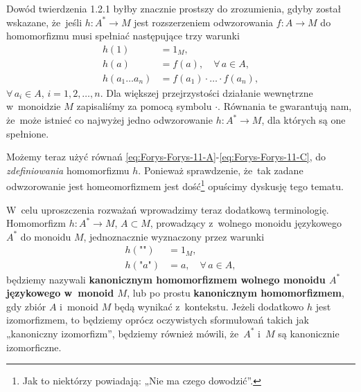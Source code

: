 \documentclass[a4paper,11pt]{article}
\begin{document}
\start {} Dowód twierdzenia 1.2.1 byłby znacznie prostszy do
zrozumienia, gdyby został wskazane, że~jeśli $h : A^{ * } \to M$ jest
rozszerzeniem odwzorowania $f : A \to M$ do homomorfizmu musi spełniać
następujące trzy warunki
\begin{subequations}
  \begin{align}
    \label{eq:Forys-Forys-11-A}
    h( 1 ) &= 1_{ M }, \\
    \label{eq:Forys-Forys-11-B}
    h( a ) &= f( a ), \quad \forall \, a \in A, \\
    \label{eq:Forys-Forys-11-C}
    h( a_{ 1 } \ldots a_{ n } )
           &= f( a_{ 1 } ) \cdot \ldots \cdot f( a_{ n } ),
  \end{align}
\end{subequations}
$\forall \, a_{ i } \in A$, $i = 1, 2, \ldots, n$. Dla większej przejrzystości działanie
wewnętrzne w~monoidzie $M$ zapisaliśmy za pomocą symbolu $\cdot$. Równania te
gwarantują nam, że~może istnieć co najwyżej jedno odwzorowanie
$h : A^{ * } \to M$, dla których są one spełnione.

Możemy teraz użyć równań
\eqref{eq:Forys-Forys-11-A}-\eqref{eq:Forys-Forys-11-C}, do
\textit{zdefiniowania} homomorfizmu $h$. Ponieważ sprawdzenie, że~tak zadane
odwzorowanie jest homeomorfizmem jest dość\footnote{Jak to niektórzy
  powiadają: „Nie ma czego dowodzić”.} opuścimy dyskusję tego tematu.

\vspace{\spaceFour}





\start {} W~celu uproszczenia rozważań wprowadzimy teraz dodatkową
terminologię. Homomorfizm $h : A^{ * } \to M$, $A \subset M$, prowadzący z~wolnego
monoidu językowego $A^{ * }$ do monoidu $M$, jednoznacznie wyznaczony przez
warunki
\begin{subequations}
  \begin{align}
    \label{eq:Forys-Forys-12-A}
    h( \texttt{""} ) &= 1_{ M }, \\
    \label{eq:Forys-Forys-12-B}
    h( \texttt{"} a \texttt{"} ) &= a, \quad
                                   \forall \, a \in A,
  \end{align}
\end{subequations}
będziemy nazywali \textbf{kanonicznym homomorfizmem wolnego monoidu $A^{ * }$
  językowego w~monoid $M$}, lub po prostu \textbf{kanonicznym
  homomorfizmem}, gdy zbiór $A$ i~monoid $M$ będą wynikać z~kontekstu.
Jeżeli dodatkowo $h$ jest izomorfizmem, to będziemy oprócz oczywistych
sformułowań takich jak „kanoniczny izomorfizm”, będziemy również mówili,
że~$A^{ * }$ i~$M$ są kanonicznie izomorficzne.
\end{document}
